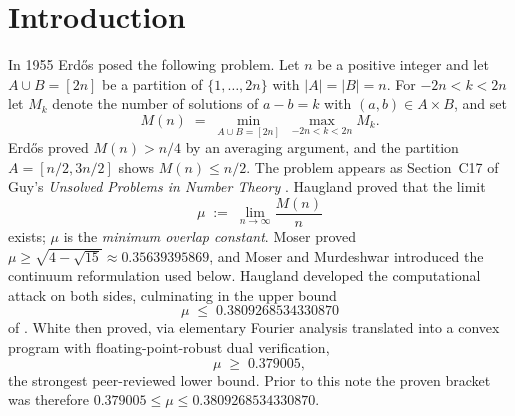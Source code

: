 \documentclass[11pt]{article}
\theoremstyle{remark}
\begin{document}
\section{Introduction}\label{sec:intro}

In 1955 Erd\H{o}s \cite{Erdos55} posed the following problem. Let $n$ be a
positive integer and let $A \cup B = [2n]$ be a partition of
$\{1,\dots,2n\}$ with $|A| = |B| = n$. For $-2n < k < 2n$ let $M_k$ denote the
number of solutions of $a - b = k$ with $(a,b) \in A \times B$, and set
\[
M(n) \;=\; \min_{A \cup B = [2n]} \; \max_{-2n<k<2n} M_k .
\]
Erd\H{o}s proved $M(n) > n/4$ by an averaging argument, and the partition
$A = [n/2, 3n/2]$ shows $M(n) \le n/2$. The problem appears as Section~C17 of
Guy's \emph{Unsolved Problems in Number Theory} \cite{Guy04}. Haugland
\cite{Haugland96} proved that the limit
\[
\mu \;:=\; \lim_{n\to\infty} \frac{M(n)}{n}
\]
exists; $\mu$ is the \emph{minimum overlap constant}. Moser \cite{Moser59}
proved $\mu \ge \sqrt{4-\sqrt{15}} \approx 0.35639395869$, and Moser and
Murdeshwar \cite{MoserMurdeshwar66} introduced the continuum reformulation
used below. Haugland \cite{Haugland96,Haugland16} developed the computational
attack on both sides, culminating in the upper bound
\begin{equation}\label{eq:haugland}
\mu \;\le\; 0.3809268534330870
\end{equation}
of \cite{Haugland16}. White \cite{White22} then proved, via elementary
Fourier analysis translated into a convex program with floating-point-robust
dual verification,
\begin{equation}\label{eq:white}
\mu \;\ge\; 0.379005 ,
\end{equation}
the strongest peer-reviewed lower bound. Prior to this note the proven
bracket was therefore $0.379005 \le \mu \le 0.3809268534330870$.
\end{document}

